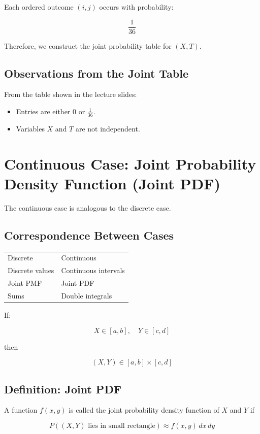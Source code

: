 \documentclass{article}
\begin{document}
Each ordered outcome $(i,j)$ occurs with probability:

\[
\frac{1}{36}
\]

Therefore, we construct the joint probability table for $(X,T)$.

\subsection*{Observations from the Joint Table}

From the table shown in the lecture slides:

\begin{itemize}
\item Entries are either $0$ or $\frac{1}{36}$.
\item Variables $X$ and $T$ are not independent.
\end{itemize}

\section{Continuous Case: Joint Probability Density Function (Joint PDF)}

The continuous case is analogous to the discrete case.

\subsection*{Correspondence Between Cases}

\begin{tabular}{ll}
Discrete & Continuous \\
Discrete values & Continuous intervals \\
Joint PMF & Joint PDF \\
Sums & Double integrals
\end{tabular}

If:

\[
X\in[a,b],\quad Y\in[c,d]
\]

then

\[
(X,Y)\in[a,b]\times[c,d]
\]

\subsection{Definition: Joint PDF}

A function $f(x,y)$ is called the joint probability density function of $X$ and $Y$ if

\[
P((X,Y)\text{ lies in small rectangle}) \approx f(x,y)\,dx\,dy
\]
\end{document}
